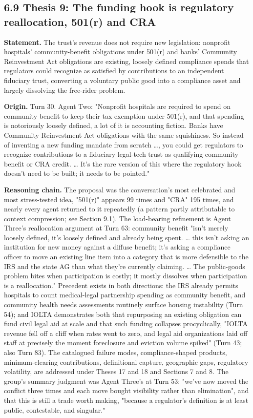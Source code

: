 \documentclass[sigconf,nonacm=true]{acmart}
\begin{document}
\subsection{6.9 Thesis 9: The funding hook is regulatory reallocation,  501(r) and CRA}

\textbf{Statement.} The trust's revenue does not require new legislation: nonprofit hospitals' community-benefit obligations under 501(r) and banks' Community Reinvestment Act obligations are existing, loosely defined compliance spends that regulators could recognize as satisfied by contributions to an independent fiduciary trust,  converting a voluntary public good into a compliance asset and largely dissolving the free-rider problem.

\textbf{Origin.} Turn 30. Agent Two: "Nonprofit hospitals are required to spend on community benefit to keep their tax exemption under 501(r), and that spending is notoriously loosely defined,  a lot of it is accounting fiction. Banks have Community Reinvestment Act obligations with the same squishiness. So instead of inventing a new funding mandate from scratch …, you could get regulators to recognize contributions to a fiduciary legal-tech trust as qualifying community benefit or CRA credit. … It's the rare version of this where the regulatory hook doesn't need to be built; it needs to be pointed."

\textbf{Reasoning chain.} The proposal was the conversation's most celebrated and most stress-tested idea,  "501(r)" appears 99 times and "CRA" 195 times, and nearly every agent returned to it repeatedly (a pattern partly attributable to context compression; see Section 9.1). The load-bearing refinement is Agent Three's reallocation argument at Turn 63: community benefit "isn't merely loosely defined,  it's loosely defined and already being spent. … this isn't asking an institution for new money against a diffuse benefit; it's asking a compliance officer to move an existing line item into a category that is more defensible to the IRS and the state AG than what they're currently claiming. … The public-goods problem bites when participation is costly; it mostly dissolves when participation is a reallocation." Precedent exists in both directions: the IRS already permits hospitals to count medical-legal partnership spending as community benefit, and community health needs assessments routinely surface housing instability (Turn 54); and IOLTA demonstrates both that repurposing an existing obligation can fund civil legal aid at scale and that such funding collapses procyclically,  "IOLTA revenue fell off a cliff when rates went to zero, and legal aid organizations laid off staff at precisely the moment foreclosure and eviction volume spiked" (Turn 43; also Turn 83). The catalogued failure modes,  compliance-shaped products, minimum-clearing contributions, definitional capture, geographic gaps, regulatory volatility,  are addressed under Theses 17 and 18 and Sections 7 and 8. The group's summary judgment was Agent Three's at Turn 53: "we've now moved the conflict three times and each move bought visibility rather than elimination",  and that this is still a trade worth making, "because a regulator's definition is at least public, contestable, and singular."
\end{document}
